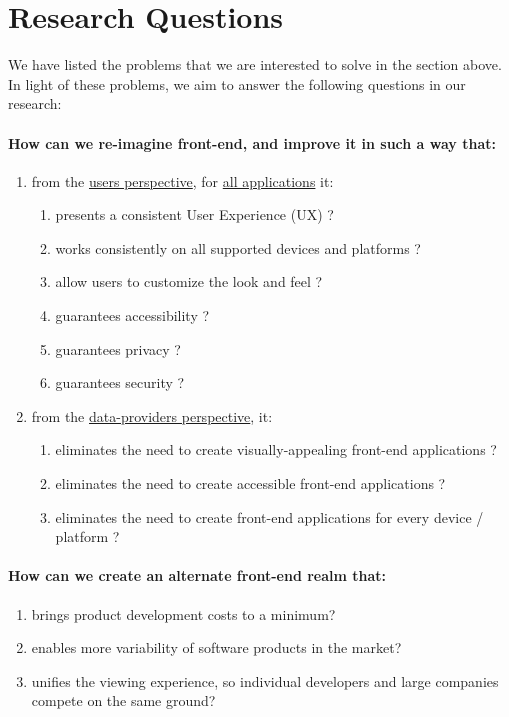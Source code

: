 
\section{Research Questions}

We have listed the problems that we are interested to solve in the section above. In light of these problems, we aim to answer the following questions in our research:

\paragraph{How can we re-imagine front-end, and improve it in such a way that:}
\begin{enumerate}
  \item from the \underline{users perspective}, for \underline{all applications} it:
  \begin{enumerate}
    \item presents a consistent User Experience (UX) ?
    \item works consistently on all supported devices and platforms ?
    \item allow users to customize the look and feel ?
    \item guarantees accessibility ?
    \item guarantees privacy ?
    \item guarantees security ?
  \end{enumerate}
  \item from the \underline{data-providers perspective}, it:
  \begin{enumerate}
    \item eliminates the need to create visually-appealing front-end applications ?
    \item eliminates the need to create accessible front-end applications ?
    \item eliminates the need to create front-end applications for every device / platform ?
  \end{enumerate}
\end{enumerate}

\paragraph{How can we create an alternate front-end realm that:}
\begin{enumerate}
  \item brings product development costs to a minimum?
  \item enables more variability of software products in the market?
  \item unifies the viewing experience, so individual developers and large companies compete on the same ground?
\end{enumerate}